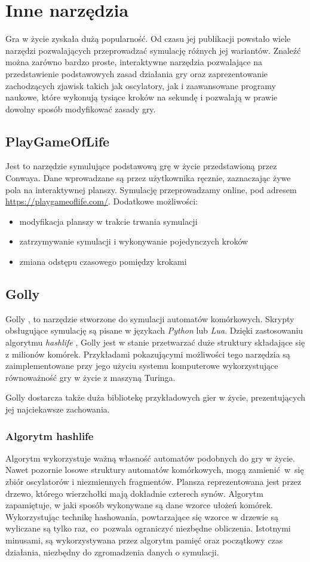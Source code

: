 \documentclass[declaration,shortabstract, inz]{iithesis}
\theoremstyle{definition} \newtheorem{definition}{Definicja}[]
\theoremstyle{plain} \newtheorem{remark}[definition]{Obserwacja}
\theoremstyle{plain} \newtheorem{theorem}[definition]{Twierdzenie}
\theoremstyle{plain} \newtheorem{example}{Przykład}[definition]
\theoremstyle{plain} \newtheorem{lemma}[definition]{Lemat}
\begin{document}
\chapter{Inne narzędzia}
Gra w życie zyskała dużą popularność. Od czasu jej publikacji powstało wiele narzędzi pozwalających przeprowadzać symulację różnych jej wariantów. Znaleźć można zarówno bardzo proste, interaktywne narzędzia pozwalające na przedstawienie podstawowych zasad działania gry oraz zaprezentowanie zachodzących zjawisk takich jak oscylatory, jak i zaawansowane programy naukowe, które wykonują tysiące kroków na sekundę i pozwalają w prawie dowolny sposób modyfikować zasady gry.
\section{PlayGameOfLife}
Jest to narzędzie symulujące podstawową grę w życie przedstawioną przez Conwaya. Dane wprowadzane są przez użytkownika ręcznie, zaznaczając żywe pola na interaktywnej planszy. Symulację przeprowadzamy online, pod adresem \url{https://playgameoflife.com/}. Dodatkowe możliwości:
\begin{itemize}
\item modyfikacja planszy w trakcie trwania symulacji
\item zatrzymywanie symulacji i wykonywanie pojedynczych kroków
\item zmiana odstępu czasowego pomiędzy krokami
\end{itemize}

\section{Golly}
Golly \cite{golly}, to narzędzie stworzone do symulacji automatów komórkowych. Skrypty obsługujące symulację są pisane w językach \textit{Python} lub \textit{Lua}. Dzięki zastosowaniu algorytmu \textit{hashlife} \cite{hashlife}, Golly jest w stanie przetwarzać duże struktury składające się z milionów komórek. Przykładami pokazującymi możliwości tego narzędzia są zaimplementowane przy jego użyciu systemu komputerowe wykorzystujące równoważność gry w życie z maszyną Turinga.

Golly dostarcza także duża bibliotekę przykładowych gier w życie, prezentujących jej najciekawsze zachowania.


\subsection{Algorytm hashlife}
Algorytm wykorzystuje ważną własność automatów podobnych do gry w życie. Nawet pozornie losowe struktury automatów komórkowych, mogą zamienić~w~się zbiór oscylatorów i niezmiennych fragmentów. Plansza reprezentowana jest przez drzewo, którego wierzchołki mają dokładnie czterech synów. Algorytm zapamiętuje, w jaki sposób wykonywane są dane wzorce ułożeń komórek. Wykorzystując technikę hashowania, powtarzające się wzorce w drzewie są wyliczane są tylko raz, co~pozwala ograniczyć niezbędne obliczenia. Istotnymi minusami, są wykorzystywana przez algorytm pamięć oraz początkowy czas działania, niezbędny do zgromadzenia danych o symulacji.


\nocite{woronoj}


\end{document}
